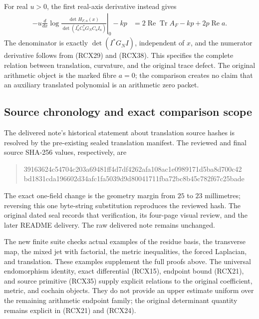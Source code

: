 \documentclass{article}
\begin{document}
For real \(u>0\), the first real-axis derivative instead gives
\[
\begin{split}
 -u\left.\frac d{dx}
   \log\frac{\det H_{F,a}(x)}
                 {\det(I_a^*C_a^*G_NC_aI_a)}\right|_0-kp
   &=2\operatorname{Re}\operatorname{Tr}A_F-kp
       +2p\operatorname{Re}a .
\end{split}\tag{RCX39}
\]
The denominator is exactly \(\det(I^*G_NI)\), independent of
\(x\), and the numerator derivative follows from (RCX29) and
(RCX38). This specifies the complete relation between translation,
curvature, and the original trace defect. The original arithmetic
object is the marked fibre \(a=0\); the comparison creates no claim
that an auxiliary translated polynomial is an arithmetic zero packet.

\subsection{Source chronology and exact comparison scope}

The delivered note's historical statement about translation source
hashes is resolved by the pre-existing sealed translation manifest.
The reviewed and final source SHA-256 values, respectively, are
\begin{quote}\small\ttfamily
\noindent
39163624c54704c203a69481ff4d7df4262afa108ac1e0989171d5ba8d700c42\\
bd1831cda196602d34afc1fa5039d9d80041711fba72bc8b45c782f67c25bade
\end{quote}
The exact one-field change is the geometry margin from \(25\) to
\(23\) millimetres; reversing this one byte-string substitution
reproduces the reviewed hash. The original dated seal records
that verification, its four-page visual review, and the later
README delivery. The raw delivered note remains unchanged.

The new finite suite checks actual examples of the residue basis,
the transverse map, the mixed jet with factorial, the metric
inequalities, the forced Laplacian, and translation. These examples
supplement the full proofs above. The universal endomorphism
identity, exact differential (RCX15), endpoint bound (RCX21), and
source primitive (RCX35) supply explicit relations to the original
coefficient, metric, and cochain objects. They do not provide an
upper estimate uniform over the remaining arithmetic endpoint
family; the original determinant quantity remains explicit in
(RCX21) and (RCX24).
\end{document}
